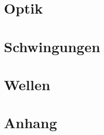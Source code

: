 \documentclass[8pt, a4paper, twoside]{extarticle}
\begin{document}
    \begin{layout}
        \part{Optik}
        
        
        
        
        
    
        \columnbreak

        \part{Schwingungen}
		
        
        
        
        \columnbreak

        \part{Wellen}
		
        
        
        
        

        \columnbreak

        \part{Anhang}
		
    \end{layout}
\end{document}
